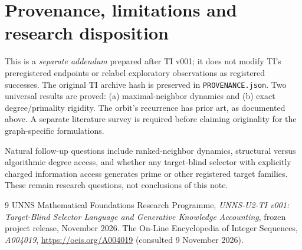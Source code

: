 \documentclass[11pt,a4paper]{article}
\begin{document}
\section{Provenance, limitations and research disposition}
This is a \emph{separate addendum} prepared after TI v001; it does not modify TI's preregistered endpoints or relabel exploratory observations as registered successes. The original TI archive hash is preserved in \texttt{PROVENANCE.json}. Two universal results are proved: (a) maximal-neighbor dynamics and (b) exact degree/primality rigidity. The orbit's recurrence has prior art, as documented above. A separate literature survey is required before claiming originality for the graph-specific formulations.

Natural follow-up questions include ranked-neighbor dynamics, structural versus algorithmic degree access, and whether any target-blind selector with explicitly charged information access generates prime or other registered target families. These remain research questions, not conclusions of this note.

\begin{thebibliography}{9}
 UNNS Mathematical Foundations Research Programme, \emph{UNNS-U2-TI v001: Target-Blind Selector Language and Generative Knowledge Accounting}, frozen project release, November 2026.
 The On-Line Encyclopedia of Integer Sequences, \emph{A004019}, \url{https://oeis.org/A004019} (consulted 9 November 2026).
\end{thebibliography}
\end{document}
